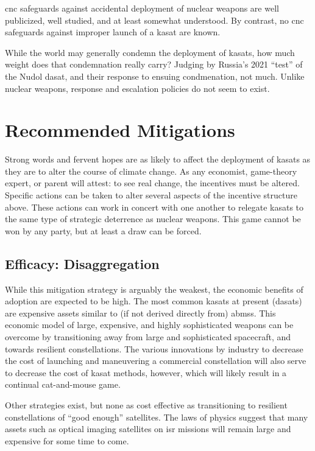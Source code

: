 \ac{cnc} safeguards against accidental deployment of nuclear weapons
are well publicized, well studied, and at least somewhat understood.
By contrast, no \ac{cnc} safeguards against improper launch of a
\ac{kasat} are known.

While the world may generally condemn the deployment of \acp{kasat},
how much weight does that condemnation really carry?  Judging by
Russia's 2021 ``test'' of the Nudol \ac{dasat}, and their response to
ensuing condmenation, not much.  Unlike nuclear weapons, response and
escalation policies do not seem to exist.


\section*{Recommended Mitigations}

Strong words and fervent hopes are as likely to affect the deployment
of \acp{kasat} as they are to alter the course of climate change.  As
any economist, game-theory expert, or parent will attest: to see real
change, the incentives must be altered.  Specific actions can be taken
to alter several aspects of the incentive structure above.  These
actions can work in concert with one another to relegate \acp{kasat}
to the same type of strategic deterrence as nuclear weapons.  This
game cannot be won by any party, but at least a draw can be forced.


\subsection*{Efficacy: Disaggregation}
While this mitigation strategy is arguably the weakest, the economic
benefits of adoption are expected to be high.  The most common
\acp{kasat} at present (\acp{dasat}) are expensive assets similar to
(if not derived directly from) \acp{abms}.  This economic model of
large, expensive, and highly sophisticated weapons can be overcome by
transitioning away from large and sophisticated spacecraft, and
towards resilient constellations.  The various innovations by industry
to decrease the cost of launching and maneuvering a commercial
constellation will also serve to decrease the cost of \ac{kasat}
methods, however, which will likely result in a continual
cat-and-mouse game.

Other strategies exist, but none as cost effective as transitioning to
resilient constellations of ``good enough'' satellites.  The laws of
physics suggest that many assets such as optical imaging satellites on
\ac{isr} missions will remain large and expensive for some time to
come.

